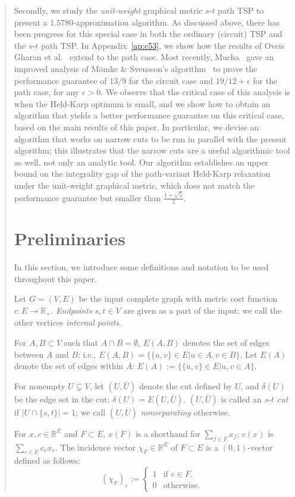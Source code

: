 \documentclass[11pt,letterpaper]{article}
\newcommand{\st}{\mbox{$s$-$t$} }
\begin{document}
\begin{quote}
Secondly, we study the \emph{unit-weight} graphical metric \st path TSP to present a $1.5780$-approximation algorithm. As discussed above, there has been progress for this special case in both the ordinary (circuit) TSP and the \st path TSP. In Appendix~\ref{ap:c53}, we show how the results of Oveis Gharan et al.~\cite{OSS} extend to the path case. Most recently, Mucha~\cite{M} gave an improved analysis of M\"omke \& Svensson's algorithm~\cite{MS} to prove the performance guarantee of $13/9$ for the circuit case and $19/12+\epsilon$ for the path case, for any $\epsilon>0$. We observe that the critical case of this analysis is when the Held-Karp optimum is small, and we show how to obtain an algorithm that yields a better performance guarantee on this critical case, based on the main results of this paper. In particular, we devise an algorithm that works on narrow cuts to be run in parallel with the present algorithm; this illustrates that the narrow cuts are a useful algorithmic tool as well, not only an analytic tool. Our algorithm establishes an upper bound on the integrality gap of the path-variant Held-Karp relaxation under the unit-weight graphical metric, which does not match the performance guarantee but smaller than $\frac{1+\sqrt{5}}{2}$.

\section{Preliminaries}\label{s:pre}

In this section, we introduce some definitions and notation to be used throughout this paper.

Let $G=(V,E)$ be the input complete graph with metric cost function $c:E\to\mathbb{R}_+$. \emph{Endpoints} $s,t\in V$ are given as a part of the input; we call the other vertices \emph{internal points}.

For $A,B\subset V$ such that $A\cap B=\emptyset$, $E(A,B)$ denotes the set of edges between $A$ and $B$: i.e., $E(A,B)=\{\{u,v\}\in E|u\in A,v\in B\}$. Let $E(A)$ denote the set of edges within $A$: $E(A):=\{\{u,v\}\in E|u,v\in A\}$.

For nonempty $U\subsetneq V$, let $(U,\bar U)$ denote the cut defined by $U$, and $\delta(U)$ be the edge set in the cut: $\delta(U)=E(U,\bar U)$. $(U,\bar U)$ is called an \st \emph{cut} if $|U\cap\{s,t\}|=1$; we call $(U,\bar U)$ \emph{nonseparating} otherwise.

For $x,c\in\mathbb{R}^E$ and $F\subset E$, $x(F)$ is a shorthand for $\sum_{f\in F}x_f$; $c(x)$ is $\sum_{e\in E} c_e x_e$. The incidence vector $\chi_F\in\mathbb{R}^E$ of $F\subset E$ is a $(0,1)$-vector defined as follows:\[
(\chi_F)_e := \begin{cases}
1&\textrm{if }e\in F,\\
0&\textrm{otherwise}
.\end{cases}
\]


\end{quote}
\end{document}
